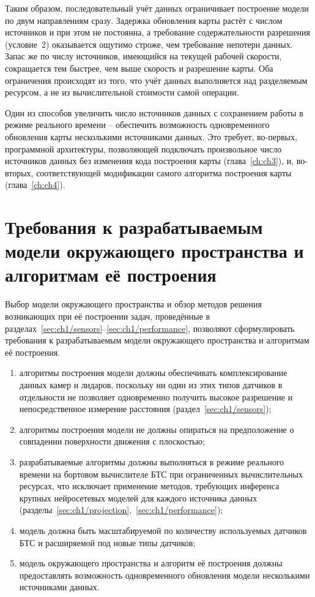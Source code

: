 Таким образом, последовательный учёт данных ограничивает построение модели по двум направлениям сразу. Задержка обновления карты растёт с числом источников и при этом не постоянна, а требование содержательности разрешения (условие~2) оказывается ощутимо строже, чем требование непотери данных. Запас же по числу источников, имеющийся на текущей рабочей скорости, сокращается тем быстрее, чем выше скорость и разрешение карты. Оба ограничения происходят из того, что учёт данных выполняется над разделяемым ресурсом, а не из вычислительной стоимости самой операции. 

Один из способов увеличить число источников данных с сохранением работы в режиме реального времени -- обеспечить возможность одновременного обновления карты несколькими источниками данных. Это требует, во-первых, программной архитектуры, позволяющей подключать произвольное число источников данных без изменения кода построения карты (глава~\cref{ch:ch3}), и, во-вторых, соответствующей модификации самого алгоритма построения карты (глава~\cref{ch:ch4}).

\section{Требования к разрабатываемым модели окружающего пространства и алгоритмам её построения}\label{sec:ch1/problem}

Выбор модели окружающего пространства и обзор методов решения возникающих при её построении задач, проведённые в разделах~\cref{sec:ch1/sensors}--\cref{sec:ch1/performance}, позволяют сформулировать требования к разрабатываемым модели окружающего пространства и алгоритмам её построения.

\begin{enumerate}
	\item алгоритмы построения модели должны обеспечивать комплексирование данных камер и лидаров, поскольку ни один из этих типов датчиков в отдельности не позволяет одновременно получить высокое разрешение и непосредственное измерение расстояния (раздел~\cref{sec:ch1/sensors});
	\item алгоритмы построения модели не должны опираться на предположение о совпадении поверхности движения с плоскостью;
	\item разрабатываемые алгоритмы должны выполняться в режиме реального времени на бортовом вычислителе БТС при ограниченных вычислительных ресурсах, что исключает применение методов, требующих инференса крупных нейросетевых моделей для каждого источника данных (разделы~\cref{sec:ch1/projection},~\cref{sec:ch1/performance});
	\item модель должна быть масштабируемой по количеству используемых датчиков БТС и расширяемой под новые типы датчиков;
	\item модель окружающего пространства и алгоритм её построения должны предоставлять возможность одновременного обновления модели несколькими источниками данных.
\end{enumerate}


